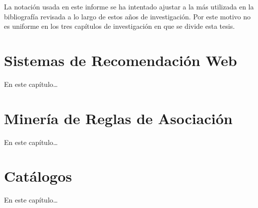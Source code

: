 La notación usada en este informe se ha intentado ajustar a la más utilizada en la bibliografía revisada a lo largo de estos años de investigación. Por este motivo no es uniforme en los tres capítulos de investigación en que se divide esta tesis.

\section{Sistemas de Recomendación Web}
En este capítulo\ldots




\section{Minería de Reglas de Asociación}
En este capítulo\ldots




\section{Catálogos}
En este capítulo\ldots




